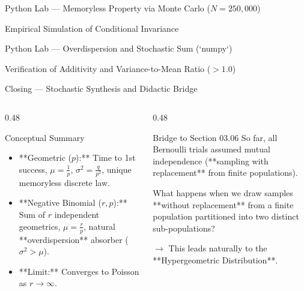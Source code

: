 \documentclass[aspectratio=169,xcolor={dvipsnames,table}]{beamer}
\begin{document}
\begin{frame}[fragile]{Python Lab --- Memoryless Property via Monte Carlo ($N=250,000$)}
	\begin{block}{Empirical Simulation of Conditional Invariance}
		
	\end{block}
\end{frame}

\begin{frame}[fragile]{Python Lab --- Overdispersion and Stochastic Sum (`numpy`)}
	\begin{block}{Verification of Additivity and Variance-to-Mean Ratio ($>1.0$)}
		
	\end{block}
\end{frame}

\begin{frame}{Closing --- Stochastic Synthesis and Didactic Bridge}
	\begin{columns}[T]
		\begin{column}{0.48\textwidth}
			\begin{block}{Conceptual Summary}
				\small
				\begin{itemize}
					\itemsep=0.08cm
					\item **Geometric ($p$):** Time to 1st success, $\mu = \frac{1}{p}$, $\sigma^2 = \frac{q}{p^2}$, unique memoryless discrete law.
					\item **Negative Binomial ($r, p$):** Sum of $r$ independent geometrics, $\mu = \frac{r}{p}$, natural **overdispersion** absorber ($\sigma^2 > \mu$).
					\item **Limit:** Converges to Poisson as $r \to \infty$.
				\end{itemize}
			\end{block}
		\end{column}
		\begin{column}{0.48\textwidth}
			\begin{alertblock}{Bridge to Section 03.06}
				\small
				So far, all Bernoulli trials assumed mutual independence (**sampling with replacement** from finite populations).
				
				What happens when we draw samples **without replacement** from a finite population partitioned into two distinct sub-populations?
				
				$\to$ This leads naturally to the **Hypergeometric Distribution**.
			\end{alertblock}
		\end{column}
	\end{columns}
\end{frame}
\end{document}
